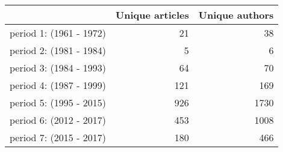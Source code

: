 \begin{tabular}{lrr}
\toprule
{} &  \textbf{Unique articles} &  \textbf{Unique authors} \\
\midrule
period 1: (1961 - 1972) &               21 &              38 \\
period 2: (1981 - 1984) &                5 &               6 \\
period 3: (1984 - 1993) &               64 &              70 \\
period 4: (1987 - 1999) &              121 &             169 \\
period 5: (1995 - 2015) &              926 &            1730 \\
period 6: (2012 - 2017) &              453 &            1008 \\
period 7: (2015 - 2017) &              180 &             466 \\
\bottomrule
\end{tabular}
